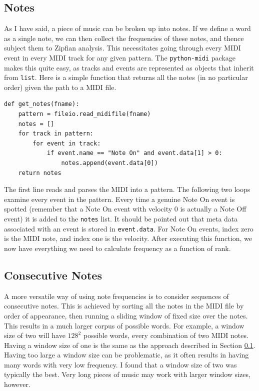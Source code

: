 \documentclass[10pt]{book}
\begin{document}
\subsection{Notes}
\label{sec:note_group}
As I have said, a piece of music can be broken up into notes. If we define a word as a single note, we can then collect the frequencies of these notes, and thence subject them to Zipfian analysis. This necessitates going through every MIDI event in every MIDI track for any given pattern. The \texttt{python-midi} package makes this quite easy, as tracks and events are represented as objects that inherit from \texttt{list}. Here is a simple function that returns all the notes (in no particular order) given the path to a MIDI file.

\begin{verbatim}
def get_notes(fname):
    pattern = fileio.read_midifile(fname)
    notes = []
    for track in pattern:
        for event in track:
            if event.name == "Note On" and event.data[1] > 0:
                notes.append(event.data[0])
    return notes
\end{verbatim}

The first line reads and parses the MIDI into a pattern. The following two loops examine every event in the pattern. Every time a genuine Note On event is spotted (remember that a Note On event with velocity 0 is actually a Note Off event) it is added to the \texttt{notes} list. It should be pointed out that meta data associated with an event is stored in \texttt{event.data}. For Note On events, index zero is the MIDI note, and index one is the velocity. After executing this function, we now have everything we need to calculate frequency as a function of rank.


\subsection{Consecutive Notes}
A more versatile way of using note frequencies is to consider sequences of consecutive notes. This is achieved by sorting all the notes in the MIDI file by order of appearance, then running a sliding window of fixed size over the notes. This results in a much larger corpus of possible words. For example, a window size of two will have $128^2$ possible words, every combination of two MIDI notes. Having a window size of one is the same as the approach described in Section \ref{sec:note_group}. Having too large a window size can be problematic, as it often results in having many words with very low frequency. I found that a window size of two was typically the best. Very long pieces of music may work with larger window sizes, however.
\end{document}
